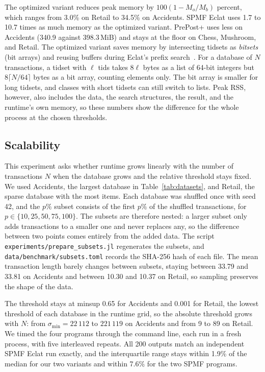 The optimized variant reduces peak memory by $100(1-M_o/M_b)$ percent, which ranges from
3.0\% on Retail to 34.5\% on Accidents. SPMF Eclat uses 1.7 to 10.7 times as much memory
as the optimized variant. PrePost+ uses less on Accidents (340.9 against 398.3\,MiB) and
stays at the floor on Chess, Mushroom, and Retail. The optimized variant saves memory by
intersecting tidsets as \emph{bitsets} (bit arrays) and reusing buffers during Eclat's
prefix search~\cite{zaki2000}. For a database of $N$ transactions, a tidset with $\ell$
tids takes $8\ell$ bytes as a list of 64-bit integers but $8\lceil N/64\rceil$ bytes as a
bit array, counting elements only. The bit array is smaller for long tidsets, and classes
with short tidsets can still switch to lists. Peak RSS, however, also includes the data,
the search structures, the result, and the runtime's own memory, so these numbers show
the difference for the whole process at the chosen thresholds.

\subsection{Scalability}
\label{sec:scalability}
This experiment asks whether runtime grows linearly with the number of transactions $N$
when the database grows and the relative threshold stays fixed. We used Accidents, the
largest database in Table~\ref{tab:datasets}, and Retail, the sparse database with the
most items. Each database was shuffled once with seed 42, and the $p\%$ subset consists of
the first $p\%$ of the shuffled transactions, for $p \in \{10, 25, 50, 75, 100\}$. The
subsets are therefore nested: a larger subset only adds transactions to a smaller one and
never replaces any, so the difference between two points comes entirely from the added
data. The script \texttt{experiments/prepare\_subsets.jl} regenerates the subsets, and
\texttt{data/benchmark/subsets.toml} records the SHA-256 hash of each file. The mean
transaction length barely changes between subsets, staying between 33.79 and 33.81 on
Accidents and between 10.30 and 10.37 on Retail, so sampling preserves the shape of the
data.

The threshold stays at minsup 0.65 for Accidents and 0.001 for Retail, the lowest
threshold of each database in the runtime grid, so the absolute threshold grows with $N$:
from $\sigma_{\min} = 22\,112$ to $221\,119$ on Accidents and from 9 to 89 on Retail. We
timed the four programs through the command line, each run in a fresh process, with five
interleaved repeats. All 200 outputs match an independent SPMF Eclat run exactly, and the
interquartile range stays within 1.9\% of the median for our two variants and within 7.6\%
for the two SPMF programs.

